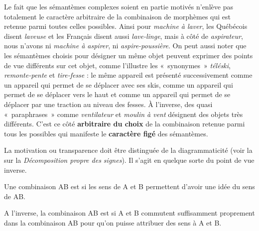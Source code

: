 Le fait que les sémantèmes complexes soient en partie motivés n’enlève pas totalement le caractère arbitraire de la combinaison de morphèmes qui est retenue parmi toutes celles possibles. Ainsi pour \textit{machine à laver}, les Québécois disent \textit{laveuse} et les Français disent aussi \textit{lave-linge}, mais à côté de \textit{aspirateur}, nous n’avons ni \textit{machine à aspirer}, ni \textit{aspire-poussière}. On peut aussi noter que les sémantèmes choisis pour désigner un même objet peuvent exprimer des points de vue différents sur cet objet, comme l’illustre les «~synonymes~» \textit{téléski}, \textit{remonte-pente} et \textit{tire-fesse} : le même appareil est présenté successivement comme un appareil qui permet de se déplacer avec ses skis, comme un appareil qui permet de se déplacer vers le haut et comme un appareil qui permet de se déplacer par une traction au niveau des fesses. À l’inverse, des quasi «~paraphrases~» comme \textit{ventilateur} et \textit{moulin à vent} désignent des objets très différents. C’est ce côté \textbf{arbitraire du choix} de la combinaison retenue parmi tous les possibles qui manifeste le \textbf{caractère figé} des sémantèmes.

La motivation ou transparence doit être distinguée de la diagrammaticité (voir la  sur la \textit{Décomposition propre des signes}). Il s’agit en quelque sorte du point de vue inverse.

\begin{styleLivreImportant}
Une combinaison AB est  si les sens de A et B permettent d’avoir une idée du sens de AB.
\end{styleLivreImportant}

\begin{styleLivreImportant}
A l’inverse, la combinaison AB est  si A et B commutent suffisamment proprement dans la combinaison AB pour qu’on puisse attribuer des sens à A et B.
\end{styleLivreImportant}


